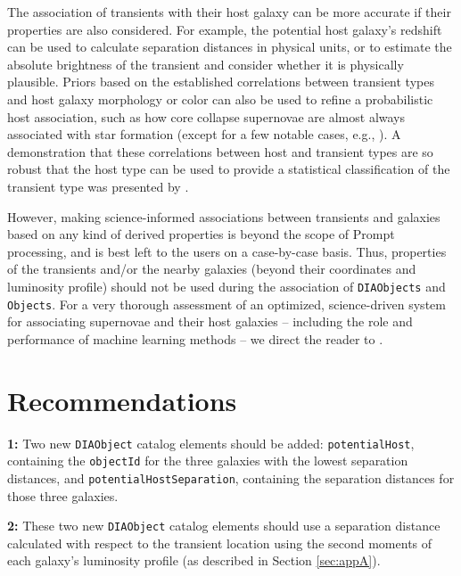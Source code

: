 \documentclass[DM,lsstdraft,authoryear,toc]{lsstdoc}
\begin{document}
The association of transients with their host galaxy can be more accurate if their properties are also considered.
For example, the potential host galaxy's redshift can be used to calculate separation distances in physical units, or to estimate the absolute brightness of the transient and consider whether it is physically plausible.
Priors based on the established correlations between transient types and host galaxy morphology or color can also be used to refine a probabilistic host association, such as how core collapse supernovae are almost always associated with star formation (except for a few notable cases, e.g., \citealt{2012ApJ...753...68G,2019ApJ...887..127I}).
A demonstration that these correlations between host and transient types are so robust that the host type can be used to provide a statistical classification of the transient type was presented by \citet{2013ApJ...778..167F}.


However, making science-informed associations between transients and galaxies based on any kind of derived properties is beyond the scope of Prompt processing, and is best left to the users on a case-by-case basis. 
Thus, properties of the transients and/or the nearby galaxies (beyond their coordinates and luminosity profile) should not be used during the association of {\tt DIAObjects} and {\tt Objects}.
For a very thorough assessment of an optimized, science-driven system for associating supernovae and their host galaxies -- including the role and performance of machine learning methods -- we direct the reader to \citet{2016AJ....152..154G}.

\section{Recommendations}\label{sec:recs}

\textbf{1: } Two new {\tt DIAObject} catalog elements should be added: {\tt potentialHost}, containing the {\tt objectId} for the three galaxies with the lowest separation distances, and {\tt potentialHostSeparation}, containing the separation distances for those three galaxies.

\textbf{2: } These two new {\tt DIAObject} catalog elements should use a separation distance calculated with respect to the transient location using the second moments of each galaxy's luminosity profile (as described in Section \ref{sec:appA}).
\end{document}
